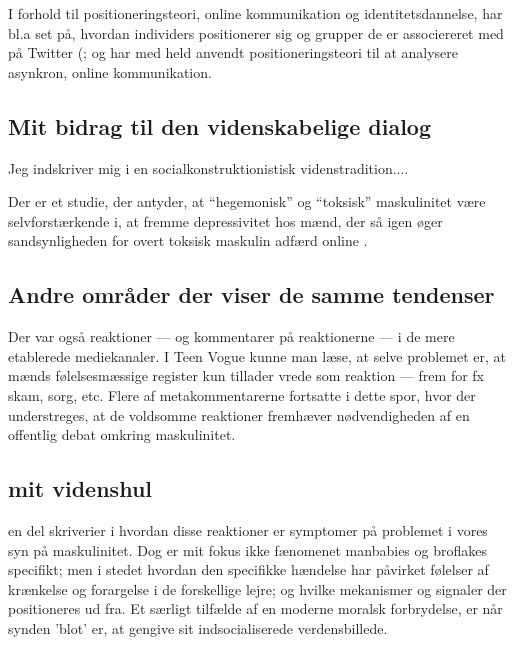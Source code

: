 I forhold til positioneringsteori, online kommunikation og 
identitetsdannelse, har bl.a 
\citeauthor{lopezlongTweetingChoirReligious2012} set på, hvordan 
individers positionerer sig og grupper de er associereret med på 
Twitter (\citeyear{lopezlongTweetingChoirReligious2012}; og 
\citeauthor{dennenFacilitatorPresenceIdentity2011} har med held 
anvendt positioneringsteori til at analysere asynkron, online 
kommunikation.

\subsection{Mit bidrag til den videnskabelige dialog}

Jeg indskriver mig i en socialkonstruktionistisk 
videnstradition....

Der er et studie, der antyder, at “hegemonisk” og “toksisk” 
maskulinitet være selvforstærkende i, at fremme depressivitet hos 
mænd, der så igen øger sandsynligheden for overt toksisk maskulin 
adfærd online \autocite{parentSocialMediaBehavior2018}.

\subsection{Andre områder der viser de samme tendenser} 

Der var også reaktioner — og kommentarer på reaktionerne — i de
mere etablerede mediekanaler. I Teen Vogue kunne man læse, at
selve problemet er, at mænds følelsesmæssige register kun tillader
vrede som reaktion — frem for fx skam, sorg, etc. Flere af
metakommentarerne fortsatte i dette spor, hvor der understreges,
at de voldsomme reaktioner fremhæver nødvendigheden af en
offentlig debat omkring maskulinitet. 

\subsection{mit videnshul}

en del skriverier i hvordan disse reaktioner er symptomer på
problemet i vores syn på maskulinitet. Dog er mit fokus ikke
fænomenet manbabies og broflakes specifikt; men i stedet hvordan
den specifikke hændelse har påvirket følelser af krænkelse og
forargelse i de forskellige lejre; og hvilke mekanismer og
signaler der positioneres ud fra. Et særligt tilfælde af en
moderne moralsk forbrydelse, er når synden 'blot' er, at gengive
sit indsocialiserede verdensbillede.

